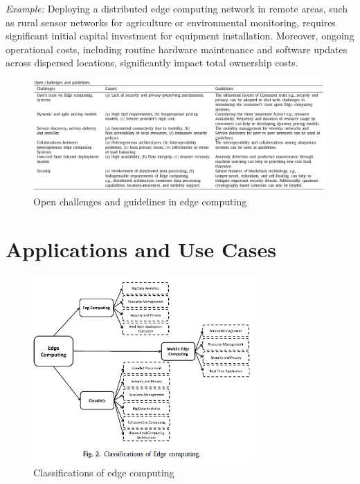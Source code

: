 \documentclass[runningheads]{llncs}
\begin{document}
\textit{Example:} Deploying a distributed edge computing network in remote areas, such as rural sensor networks for agriculture or environmental monitoring, requires significant initial capital investment for equipment installation. Moreover, ongoing operational costs, including routine hardware maintenance and software updates across dispersed locations, significantly impact total ownership costs.

\begin{figure}[ht]
    \centering
    \includegraphics[width=\textwidth]{IMG/3.png}
    \caption{Open challenges and guidelines in edge computing}
    \label{fig:open_challenges_guidelines}
    \end{figure}

\section{Applications and Use Cases}

\begin{figure}[ht]
    \centering
    \includegraphics[width=0.75\textwidth]{IMG/1.png}
    \caption{Classifications of edge computing}
    \label{fig:edge_classifications}
    \end{figure}
\end{document}
